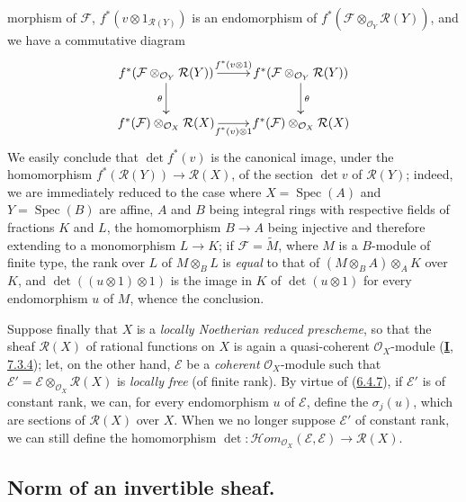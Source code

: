 \begin{env}[6.4.9]
morphism of $\mathcal{F}$,
$f^*(v\otimes1_{\mathcal{R}(Y)})$ is an endomorphism of
$f^*(\mathcal{F}\otimes_{\mathcal{O}_Y}\mathcal{R}(Y))$, and we have a
commutative diagram
\[
\xymatrix{
f^*(\mathcal{F}\otimes_{\mathcal{O}_Y}\mathcal{R}(Y))
  \ar[r]^{f^*(v\otimes1)}\ar[d]_{\theta}
& f^*(\mathcal{F}\otimes_{\mathcal{O}_Y}\mathcal{R}(Y))\ar[d]^{\theta}\\
f^*(\mathcal{F})\otimes_{\mathcal{O}_X}\mathcal{R}(X)
  \ar[r]_{f^*(v)\otimes1}
& f^*(\mathcal{F})\otimes_{\mathcal{O}_X}\mathcal{R}(X)
}
\]
We easily conclude that $\det f^*(v)$ is the canonical image, under the
homomorphism $f^*(\mathcal{R}(Y))\to\mathcal{R}(X)$, of the section
$\det v$ of $\mathcal{R}(Y)$; indeed, we are immediately reduced to the case
where $X=\operatorname{Spec}(A)$ and $Y=\operatorname{Spec}(B)$ are affine,
$A$ and $B$ being integral rings with respective fields of fractions $K$ and
$L$, the homomorphism $B\to A$ being injective and therefore extending to a
monomorphism $L\to K$; if $\mathcal{F}=\widetilde{M}$, where $M$ is a
$B$-module of finite type, the rank over $L$ of $M\otimes_B L$ is
\emph{equal} to that of $(M\otimes_B A)\otimes_A K$ over $K$, and
$\det((u\otimes1)\otimes1)$ is the image in $K$ of $\det(u\otimes1)$ for
every endomorphism $u$ of $M$, whence the conclusion.
\end{env}

\begin{env}[6.4.10]
\label{II.6.4.10}
Suppose finally that $X$ is a \emph{locally Noetherian reduced prescheme},
so that the sheaf $\mathcal{R}(X)$ of rational functions on $X$ is again a
quasi-coherent $\mathcal{O}_X$-module
(\hyperref[I.7.3.4]{\textbf{I}, 7.3.4}); let, on the other hand, $\mathcal{E}$ be a
\emph{coherent} $\mathcal{O}_X$-module such that
$\mathcal{E}'=\mathcal{E}\otimes_{\mathcal{O}_X}\mathcal{R}(X)$ is
\emph{locally free} (of finite rank). By virtue of
(\hyperref[II.6.4.7]{6.4.7}), if $\mathcal{E}'$ is of constant rank, we
can, for every endomorphism $u$ of $\mathcal{E}$, define the $\sigma_j(u)$,
which are sections of $\mathcal{R}(X)$ over $X$. When we no longer suppose
$\mathcal{E}'$ of constant rank, we can still define the homomorphism
$\det:\mathcal{H}om_{\mathcal{O}_X}(\mathcal{E},\mathcal{E})
\to\mathcal{R}(X)$.
\end{env}

\subsection{Norm of an invertible sheaf.}
\label{subsection:II.6.5}

